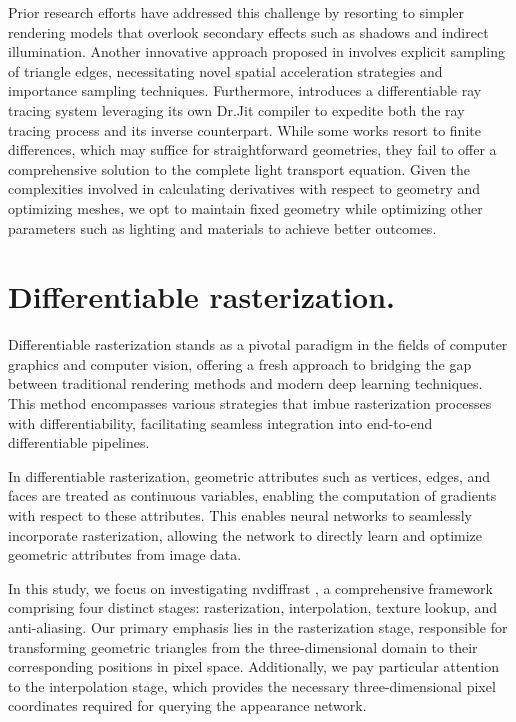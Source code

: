 \begin{survey}
Prior research efforts \cite{N3MR, OpenDR} have addressed this challenge by resorting to simpler rendering models that overlook secondary effects such as shadows and indirect illumination. Another innovative approach proposed in \cite{DiffMCRT} involves explicit sampling of triangle edges, necessitating novel spatial acceleration strategies and importance sampling techniques. Furthermore, \cite{Mitsuba3} introduces a differentiable ray tracing system leveraging its own Dr.Jit compiler to expedite both the ray tracing process and its inverse counterpart. While some works resort to finite differences, which may suffice for straightforward geometries, they fail to offer a comprehensive solution to the complete light transport equation. Given the complexities involved in calculating derivatives with respect to geometry and optimizing meshes, we opt to maintain fixed geometry while optimizing other parameters such as lighting and materials to achieve better outcomes.

\section{Differentiable rasterization.} Differentiable rasterization stands as a pivotal paradigm in the fields of computer graphics and computer vision, offering a fresh approach to bridging the gap between traditional rendering methods and modern deep learning techniques. This method encompasses various strategies that imbue rasterization processes with differentiability, facilitating seamless integration into end-to-end differentiable pipelines.

In differentiable rasterization, geometric attributes such as vertices, edges, and faces are treated as continuous variables, enabling the computation of gradients with respect to these attributes. This enables neural networks to seamlessly incorporate rasterization, allowing the network to directly learn and optimize geometric attributes from image data.

In this study, we focus on investigating nvdiffrast \cite{nvdiffrast}, a comprehensive framework comprising four distinct stages: rasterization, interpolation, texture lookup, and anti-aliasing. Our primary emphasis lies in the rasterization stage, responsible for transforming geometric triangles from the three-dimensional domain to their corresponding positions in pixel space. Additionally, we pay particular attention to the interpolation stage, which provides the necessary three-dimensional pixel coordinates required for querying the appearance network.


\end{survey}
